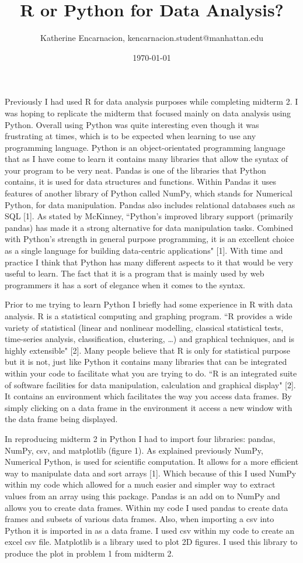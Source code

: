 \documentclass{article}
\title{R or Python for Data Analysis?}
\author{Katherine Encarnacion, kencarnacion.student@manhattan.edu}
\date{\today}
\begin{document}
\maketitle
\indent Previously I had used R for data analysis purposes while completing midterm 2. I was hoping to replicate the midterm that focused mainly on data analysis using Python. Overall using Python was quite interesting even though it was frustrating at times, which is to be expected when learning to use any programming language. Python is an object-orientated programming language that as I have come to learn it contains many libraries that allow the syntax of your program to be very neat. Pandas is one of the libraries that Python contains, it is used for data structures and functions. Within Pandas it uses features of another library of Python called NumPy, which stands for Numerical Python, for data manipulation. Pandas also includes relational databases such as SQL [1].  As stated by McKinney,  ``Python’s improved library support (primarily pandas) has made it a strong alternative for data manipulation tasks. Combined with Python’s strength in general purpose programming, it is an excellent choice as a single language for building data-centric applications" [1]. With time and practice I think that Python has many different aspects to it that would be very useful to learn. The fact that it is a program that is mainly used by web programmers it has a sort of elegance when it comes to the syntax. 


\indent Prior to me trying to learn Python I briefly had some experience in R with data analysis. R is a statistical computing and graphing program.  ``R provides a wide variety of statistical (linear and nonlinear modelling, classical statistical tests, time-series analysis, classification, clustering, …) and graphical techniques, and is highly extensible" [2].  Many people believe that R is only for statistical purpose but it is not, just like Python it contains many libraries that can be integrated within your code to facilitate what you are trying to do. ``R is an integrated suite of software facilities for data manipulation, calculation and graphical display" [2]. It contains an environment which facilitates the way you access data frames. By simply clicking on a data frame in the environment it access a new window with the data frame being displayed. 


\indent In reproducing midterm 2 in Python I had to import four libraries: pandas, NumPy, csv, and matplotlib (figure 1). As explained previously NumPy, Numerical Python, is used for scientific computation. It allows for a more efficient way to manipulate data and sort arrays [1]. Which because of this I used NumPy within my code which allowed for a much easier and simpler way to extract values from an array using this package. Pandas is an add on to NumPy and allows you to create data frames. Within my code I used pandas to create data frames and subsets of various data frames. Also, when importing a csv into Python it is imported in as a data frame. I used csv within my code to create an excel csv file. Matplotlib is a library used to plot 2D figures. I used this library to produce the plot in problem 1 from midterm 2.
\end{document}
